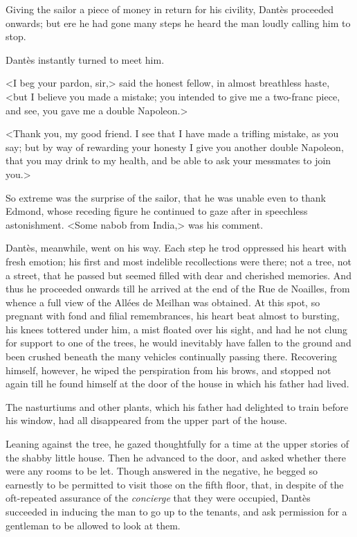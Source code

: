  Giving the sailor a piece of money in return for his civility, Dantès proceeded onwards; but ere he had gone many steps he heard the man loudly calling him to stop. 

 Dantès instantly turned to meet him. 

 <I beg your pardon, sir,> said the honest fellow, in almost breathless haste, <but I believe you made a mistake; you intended to give me a two-franc piece, and see, you gave me a double Napoleon.> 

 <Thank you, my good friend. I see that I have made a trifling mistake, as you say; but by way of rewarding your honesty I give you another double Napoleon, that you may drink to my health, and be able to ask your messmates to join you.> 

 So extreme was the surprise of the sailor, that he was unable even to thank Edmond, whose receding figure he continued to gaze after in speechless astonishment. <Some nabob from India,> was his comment. 

 Dantès, meanwhile, went on his way. Each step he trod oppressed his heart with fresh emotion; his first and most indelible recollections were there; not a tree, not a street, that he passed but seemed filled with dear and cherished memories. And thus he proceeded onwards till he arrived at the end of the Rue de Noailles, from whence a full view of the Allées de Meilhan was obtained. At this spot, so pregnant with fond and filial remembrances, his heart beat almost to bursting, his knees tottered under him, a mist floated over his sight, and had he not clung for support to one of the trees, he would inevitably have fallen to the ground and been crushed beneath the many vehicles continually passing there. Recovering himself, however, he wiped the perspiration from his brows, and stopped not again till he found himself at the door of the house in which his father had lived. 

 The nasturtiums and other plants, which his father had delighted to train before his window, had all disappeared from the upper part of the house. 

 Leaning against the tree, he gazed thoughtfully for a time at the upper stories of the shabby little house. Then he advanced to the door, and asked whether there were any rooms to be let. Though answered in the negative, he begged so earnestly to be permitted to visit those on the fifth floor, that, in despite of the oft-repeated assurance of the \textit{concierge} that they were occupied, Dantès succeeded in inducing the man to go up to the tenants, and ask permission for a gentleman to be allowed to look at them. 

